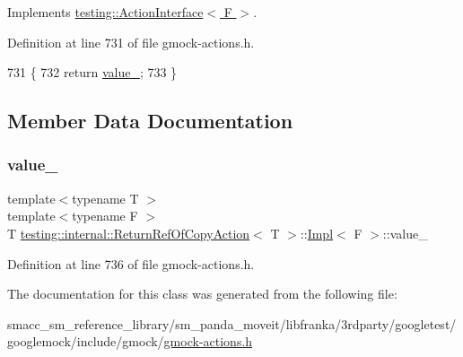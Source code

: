 Implements \hyperlink{classtesting_1_1ActionInterface_a20f8624fcea1786f2992b358760422a0}{testing\+::\+Action\+Interface$<$ F $>$}.



Definition at line 731 of file gmock-\/actions.\+h.


\begin{DoxyCode}
731                                                  \{
732       \textcolor{keywordflow}{return} \hyperlink{classtesting_1_1internal_1_1ReturnRefOfCopyAction_1_1Impl_ad253b5cad2707636b8b19970708905c3}{value\_};
733     \}
\end{DoxyCode}


\subsection{Member Data Documentation}
\mbox{\label{classtesting_1_1internal_1_1ReturnRefOfCopyAction_1_1Impl_ad253b5cad2707636b8b19970708905c3}} 
\subsubsection{\texorpdfstring{value\+\_\+}{value\_}}
{\footnotesize\ttfamily template$<$typename T $>$ \\
template$<$typename F $>$ \\
T \hyperlink{classtesting_1_1internal_1_1ReturnRefOfCopyAction}{testing\+::internal\+::\+Return\+Ref\+Of\+Copy\+Action}$<$ T $>$\+::\hyperlink{classtesting_1_1internal_1_1ReturnRefOfCopyAction_1_1Impl}{Impl}$<$ F $>$\+::value\+\_\+\hspace{0.3cm}{\ttfamily [private]}}



Definition at line 736 of file gmock-\/actions.\+h.



The documentation for this class was generated from the following file\+:\begin{DoxyCompactItemize}
\item 
smacc\+\_\+sm\+\_\+reference\+\_\+library/sm\+\_\+panda\+\_\+moveit/libfranka/3rdparty/googletest/googlemock/include/gmock/\hyperlink{gmock-actions_8h}{gmock-\/actions.\+h}\end{DoxyCompactItemize}

